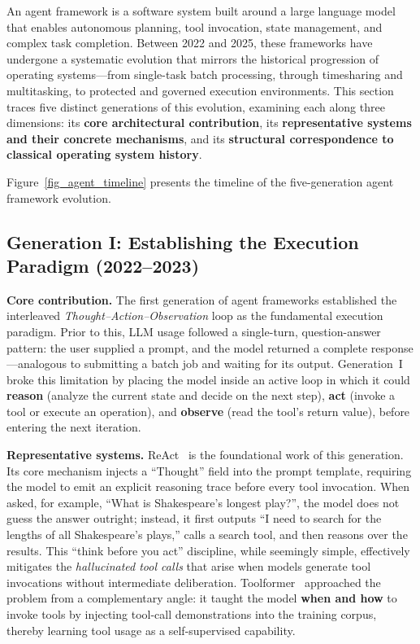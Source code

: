 \documentclass[11pt,a4paper]{article}
\begin{document}
An agent framework is a software system built around a large language model that enables autonomous planning, tool invocation, state management, and complex task completion.
Between 2022 and 2025, these frameworks have undergone a systematic evolution that mirrors the historical progression of operating systems---from single-task batch processing, through timesharing and multitasking, to protected and governed execution environments.
This section traces five distinct generations of this evolution, examining each along three dimensions: its \textbf{core architectural contribution}, its \textbf{representative systems and their concrete mechanisms}, and its \textbf{structural correspondence to classical operating system history}.

Figure~\ref{fig_agent_timeline} presents the timeline of the five-generation agent framework evolution.


\subsection{Generation I: Establishing the Execution Paradigm (2022--2023)}

\textbf{Core contribution.}
The first generation of agent frameworks established the interleaved \textit{Thought--Action--Observation} loop as the fundamental execution paradigm.
Prior to this, LLM usage followed a single-turn, question-answer pattern: the user supplied a prompt, and the model returned a complete response---analogous to submitting a batch job and waiting for its output.
Generation~I broke this limitation by placing the model inside an active loop in which it could \textbf{reason} (analyze the current state and decide on the next step), \textbf{act} (invoke a tool or execute an operation), and \textbf{observe} (read the tool's return value), before entering the next iteration.

\textbf{Representative systems.}
ReAct~\cite{yao2023react} is the foundational work of this generation.
Its core mechanism injects a ``Thought'' field into the prompt template, requiring the model to emit an explicit reasoning trace before every tool invocation.
When asked, for example, ``What is Shakespeare's longest play?'', the model does not guess the answer outright; instead, it first outputs ``I need to search for the lengths of all Shakespeare's plays,'' calls a search tool, and then reasons over the results.
This ``think before you act'' discipline, while seemingly simple, effectively mitigates the \textit{hallucinated tool calls} that arise when models generate tool invocations without intermediate deliberation.
Toolformer~\cite{schick2023toolformer} approached the problem from a complementary angle: it taught the model \textbf{when and how} to invoke tools by injecting tool-call demonstrations into the training corpus, thereby learning tool usage as a self-supervised capability.
\end{document}
